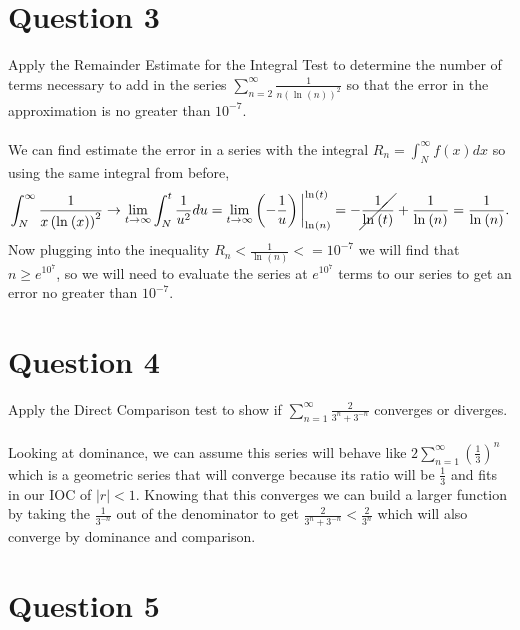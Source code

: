 \documentclass[a4paper]{article}
\begin{document}
\newpage
\section*{Question 3}%
\label{sec:Question 3}
Apply the Remainder Estimate for the Integral Test to determine the number of terms necessary to add in the series $ \sum_{ n=2 } ^{ \infty } \frac{ 1 }{ n\left( \ln^{  } \left( n \right)  \right) ^{ 2 } }  $ so that the error in the approximation is no greater than $ 10^{ -7 } $. \\ \\ 

We can find estimate the error in a series with the integral $ R_n = \int_{ N }^{ \infty } f\left( x \right) dx$ so using the same integral from before, 
\[
	\int_{ N }^{ \infty } \frac{ 1 }{ x\left( \ln^{  } \left( x \right)  \right) ^{ 2 } } \to \lim_{ t \to \infty} \int_{ N }^{ t } \frac{ 1 }{ u^2 } du = \lim_{ t \to \infty} \left( -\frac{ 1 }{ u } \right) \bigg|_{ \ln^{  } \left( n \right)  }^{ \ln^{  } \left( t \right)  } = - \cancel{\frac{ 1 }{ \ln^{  } \left( t \right)  } } + \frac{ 1 }{ \ln^{  } \left( n \right)  } = \frac{ 1 }{ \ln^{  } \left( n \right)  }
.\] 
Now plugging into the inequality $ R_n < \frac{ 1 }{ \ln^{  } \left( n \right)  } <= 10^{ -7 } $ we will find that $ n \ge e^{ 10^{ 7 } } $, so we will need to evaluate the series at $ e^{ 10^{ 7 } } $ terms to our series to get an error no greater than $ 10^{ -7 } $.

\section*{Question 4}%
\label{sec:Question 4}
Apply the Direct Comparison test to show if $ \sum_{ n=1 } ^{ \infty } \frac{ 2 }{ 3^{ n }+3^{ -n } }  $ converges or diverges. \\ \\ 

Looking at dominance, we can assume this series will behave like $  2 \sum_{ n=1 } ^{ \infty } \left( \frac{ 1 }{ 3 }  \right) ^{ n } $ which is a geometric series that will converge because its ratio will be $ \frac{ 1 }{ 3 }  $ and fits in our IOC of $ \left| r \right| < 1 $. Knowing that this converges we can build a larger function by taking the $ \frac{ 1 }{ 3^{ -n } }  $ out of the denominator to get $ \frac{ 2 }{ 3^{ n }+3^{ -n } } < \frac{ 2 }{ 3^{ n } } $ which will also converge by dominance and comparison.

\section*{Question 5}%
\label{sec:Question 5}
\end{document}
